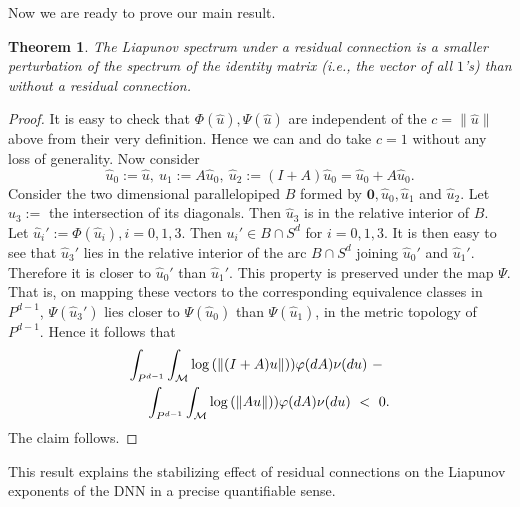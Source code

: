 \documentclass[12pt]{amsart}
\theoremstyle{plain}
\newtheorem{theorem}{Theorem}[section]
\theoremstyle{definition}
\theoremstyle{remark}
\newcommand{\M}{\mathcal{M}}
\newcommand{\0}{\textbf{0}}
\newcommand{\HA}{\mathcal{H}}
\begin{document}
Now we are ready to prove our main result. \\

\begin{theorem}\label{final}  
The Liapunov spectrum under a residual connection is a smaller perturbation of the spectrum of the identity matrix (i.e., the vector of all $1$'s) than without a residual connection.
\end{theorem}

\begin{proof} It is easy to check that $\Phi(\hat{u}), \Psi(\hat{u})$ are independent of the $c = \|\hat{u}\|$ above from their very definition. Hence we can and do take $c = 1$ without any loss of generality. Now consider  
$$\hat{u}_0 := \hat{u}, \ \hat{u}_1 := A\hat{u}_0, \ \hat{u}_2 := (I + A)\hat{u}_0 = \hat{u}_0 + A\hat{u}_0.$$ 
Consider the two dimensional parallelopiped $B$ formed by $\0, \hat{u}_0, \hat{u}_1$ and $\hat{u}_2$. Let $\hat{u}_3:=$ the intersection of its diagonals. Then $\hat{u}_3$ is in the relative interior of $B$. Let $\hat{u}_i' := \Phi(\hat{u}_i), i = 0,1,3$. Then $u_i' \in B\cap S^d$ for $ i = 0,1,3$. It is then easy to see that $\hat{u}_3'$ lies in the relative interior of the arc $B\cap S^d$ joining $\hat{u}_0'$ and $\hat{u}_1'$. Therefore it is closer to $\hat{u}_0'$ than $\hat{u}_1'$. This property is  preserved under the map $\Psi$. That is, on mapping these vectors to the corresponding equivalence classes in $P^{d-1}$, $\Psi(\hat{u}_3')$ lies closer to $\Psi(\hat{u}_0)$ than $\Psi(\hat{u}_1)$, in the metric topology of $P^{d-1}$. 
Hence it follows that
\begin{eqnarray*}
\lefteqn{\int_{P^{d-1}}\int_\M \log\left(\|(I + A)u\|\right))\varphi(dA)\nu(du) \ -} \\
&& \  \int_{P^{d-1}}\int_\M \log\left(\|Au\|\right))\varphi(dA)\nu(du) \ < \ 0.
\end{eqnarray*}
The claim follows. \end{proof}

\medskip

 This result explains the stabilizing effect of residual connections on the Liapunov exponents of the DNN in a precise quantifiable sense. 
 
\end{document}
